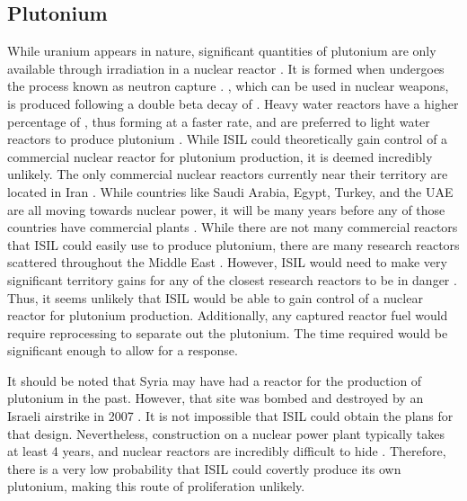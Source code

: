 \documentclass{report}
\begin{document}
\subsection{Plutonium} 

While uranium appears in nature, significant quantities of plutonium are only available through irradiation in a nuclear reactor \cite{Benedict1981}. It is formed when  undergoes the process known as neutron capture \cite{Benedict1981}. , which can be used in nuclear weapons, is produced following a double beta decay of  \cite{Duderstadt1976}. Heavy water reactors have a higher percentage of , thus forming  at a faster rate, and are preferred to light water reactors to produce plutonium \cite{Moody2014}. While ISIL could theoretically gain control of a commercial nuclear reactor for plutonium production, it is deemed incredibly unlikely. The only commercial nuclear reactors currently near their territory are located in Iran \cite{WorldNuclearAssociation2015}. While countries like Saudi Arabia, Egypt, Turkey, and the UAE are all moving towards nuclear power, it will be many years before any of those countries have commercial plants \cite{WorldNuclearAssociation2015}. While there are not many commercial reactors that ISIL could easily use to produce plutonium, there are many research reactors scattered throughout the Middle East \cite{WorldNuclearAssociation2015a}. However, ISIL would need to make very significant territory gains for any of the closest research reactors to be in danger \cite{BBC2015}. Thus, it seems unlikely that ISIL would be able to gain control of a nuclear reactor for plutonium production. Additionally, any captured reactor fuel would require reprocessing to separate out the plutonium. The time required would be significant enough to allow for a response.  

It should be noted that Syria may have had a reactor for the production of plutonium in the past. However, that site was bombed and destroyed by an Israeli airstrike in 2007 \cite{WorldNuclearAssociation2015a}. It is not impossible that ISIL could obtain the plans for that design. Nevertheless, construction on a nuclear power plant typically takes at least 4 years, and nuclear reactors are incredibly difficult to hide \cite{WorldNuclearAssociation2015a,NuclearEnergyInstitute2015}. Therefore, there is a very low probability that ISIL could covertly produce its own plutonium, making this route of proliferation unlikely.  
\end{document}
